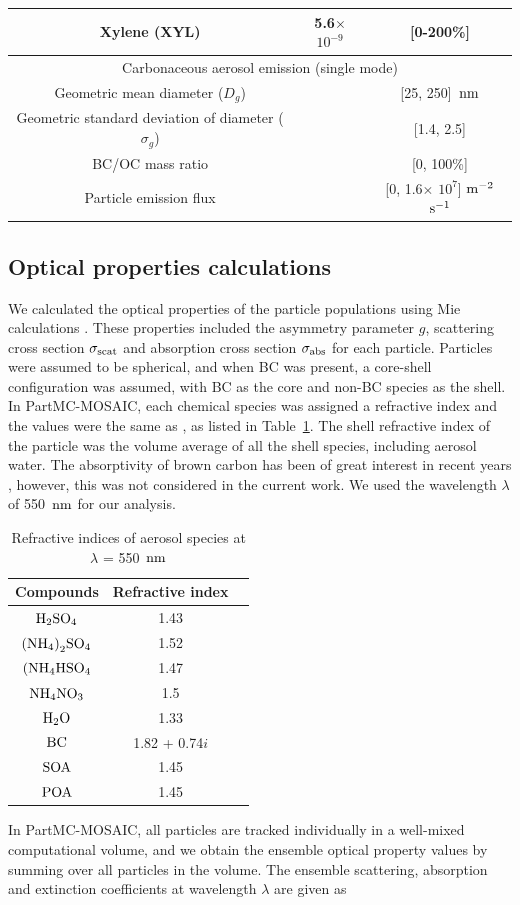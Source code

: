 \documentclass[edeposit,fullpage]{uiucthesis2009}
\makeatletter
\DeclareRobustCommand*\unit[1]
 {\ensuremath{%
   {\thinmuskip3mu\relax
    \def\mu{\text{\textmu}}\def~{\,}%
    \ifx\f@series\testbx\mathbf{#1}\else\mathrm{#1}\fi}}}
\makeatother
\begin{document}
\begin{table}
\begin{tabular}{ c c c  }
   Xylene (XYL) &5.6$\times$ $10^{-9}$&[0-200\%] \\
    \hline
    \multicolumn{3}{c}{Carbonaceous aerosol emission (single mode)} \\
    \hline
    Geometric mean diameter ($D_g$) &&[25, 250]~\unit{nm}\\
    Geometric standard deviation of diameter ($\sigma_g$) && [1.4, 2.5]\\
    BC/OC mass ratio && [0, 100\%] \\
    Particle emission flux && [0, 1.6$\times$ $10^{7}$] $\rm m^{-2}$ $\rm s^{-1}$ \\
	\hline
\end{tabular}
\end{table}

\subsection{Optical properties calculations}
We calculated the optical properties of the particle populations using
Mie calculations \citep{Zaveri2010a}. These properties included the
asymmetry parameter $g$, scattering cross section $\sigma_{\rm scat}$
and absorption cross section $\sigma_{\rm abs}$ for each
particle. Particles were assumed to be spherical, and when BC was
present, a core-shell configuration was assumed, with BC as the core
and non-BC species as the shell. In PartMC-MOSAIC, each chemical
species was assigned a refractive index and the values were the same 
as \citet{Zaveri2010a}, as listed
in Table~\ref{tab:refrc_inex}. The shell refractive index of the
particle was the volume average of all the shell species, including
aerosol water. The absorptivity of brown carbon has been of great
interest in recent years \citep{corbin2018brown, cappa2019light},
however, this was not considered in the current work. We used the
wavelength $\lambda$ of 550~\unit{nm} for our analysis.
\begin{table}
	\centering
	\caption{Refractive indices of aerosol species at $\lambda$ =
          550~\unit{nm}}
	\label{tab:refrc_inex}
	\begin{tabular}{ c  c  c }
		\hline 
		Compounds & Refractive index\\
       \hline
       $\rm H_2SO_4$ & 1.43 \\
       $\rm {(NH_4)}_2SO_4$ & 1.52 \\
       $\rm (NH_4HSO_4$ & 1.47 \\
       $\rm NH_4NO_3$ & 1.5 \\
       $\rm H_2O$ & 1.33 \\
       $\rm BC$ & 1.82 + 0.74$i$ \\
       $\rm SOA$ & 1.45  \\
       $\rm POA$ & 1.45 \\       
       \hline
	\end{tabular}
\end{table}
In PartMC-MOSAIC, all particles are tracked individually in a
well-mixed computational volume, and we obtain the ensemble
optical property values by summing over all particles in the
volume. The ensemble scattering, absorption and extinction
coefficients at wavelength $\lambda$ are given as 
\end{document}
